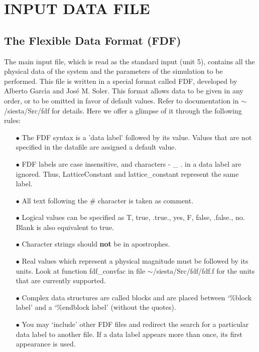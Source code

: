 \documentclass[11pt]{article}
\begin{document}
\section{INPUT DATA FILE}

\subsection{The Flexible Data Format (FDF)}

The main input file,
which is read as the standard input (unit 5),
contains all the physical data of the system and the parameters of 
the simulation to be performed.
This file is written in a special format called FDF, developed by 
Alberto Garc\'{\i}a and Jos\'e M. Soler. This format allows data to be 
given in any order, or to be omitted in favor of default values.
Refer to documentation in $\sim$/siesta/Src/fdf for details.
Here we offer a glimpse of it through the following rules:

\begin{itemize}

\item[$\bullet$] The FDF syntax is a 'data label' followed by its value.
Values that are not specified in the datafile are assigned
a default value. 

\item[$\bullet$] FDF labels are case insensitive, and characters - \_ . 
in a data label are ignored. Thus, LatticeConstant and
lattice\_constant represent the same label.

\item[$\bullet$] All text following the \# character is taken as comment.

\item[$\bullet$] Logical values can be specified as T, true, .true.,
yes, F, false, .false., no. Blank is also equivalent to true.

\item[$\bullet$] Character strings should {\bf not} be in apostrophes.

\item[$\bullet$] Real values which represent a physical magnitude must be
followed by its units. Look at function fdf\_convfac in
file $\sim$/siesta/Src/fdf/fdf.f for the units that are currently supported.

\item[$\bullet$] Complex data structures are called blocks and are
placed between `\%block label' and a `\%endblock label' 
(without the quotes).

\item[$\bullet$] You may `include' other FDF files and redirect the search
for a particular data label to another file. 
If a data label appears more than once, its first appearance
is used.

\end{itemize}
\end{document}
